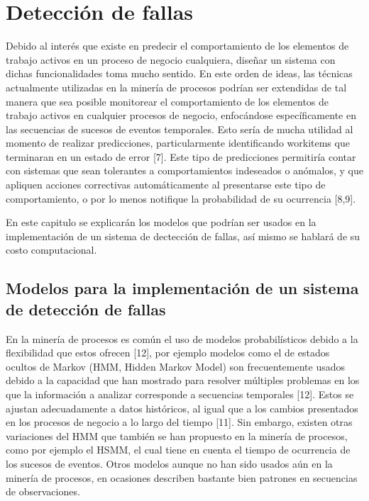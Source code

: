 \chapter{Detección de fallas}

\ifpdf
    \graphicspath{{Chapter3/Figs/Raster/}{Chapter3/Figs/PDF/}{Chapter3/Figs/}}
\else
    \graphicspath{{Chapter3/Figs/Vector/}{Chapter3/Figs/}}
\fi

Debido al interés que existe en predecir el comportamiento de los elementos de trabajo activos en un proceso de negocio cualquiera, diseñar un sistema con dichas funcionalidades toma mucho sentido. En este orden de ideas, las técnicas actualmente utilizadas en la minería de procesos podrían ser extendidas de tal manera que sea posible monitorear el comportamiento de los elementos de trabajo activos en cualquier procesos de negocio, enfocándose específicamente en las secuencias de sucesos de eventos temporales. Esto sería de mucha utilidad al momento de realizar predicciones, particularmente identificando workitems que terminaran en un estado de error [7]. Este tipo de predicciones permitiría contar con sistemas que sean tolerantes a comportamientos indeseados o anómalos, y que apliquen acciones correctivas automáticamente al presentarse este tipo de comportamiento, o por lo menos notifique la probabilidad de su ocurrencia [8,9]. 

En este capitulo se explicarán los modelos que podrían ser usados en la implementación de un sistema de dectección de fallas, así mismo se hablará de su costo computacional.

\section{Modelos para la implementación de un sistema de detección de fallas} %
\label{section3.1}

En la minería de procesos es común el uso de modelos probabilísticos debido a la flexibilidad que estos ofrecen [12], por ejemplo modelos como el de estados ocultos de Markov (HMM, Hidden Markov Model) son frecuentemente usados debido a la capacidad que han mostrado para resolver múltiples problemas en los que la información a analizar corresponde a secuencias temporales [12]. Estos se ajustan adecuadamente a datos históricos, al igual que a los cambios presentados en los procesos de negocio a lo largo del tiempo [11]. Sin embargo, existen otras variaciones del HMM que también se han propuesto en la minería de procesos, como por ejemplo el HSMM, el cual tiene en cuenta el tiempo de ocurrencia de los sucesos de eventos. Otros modelos aunque no han sido usados aún en la minería de procesos, en ocasiones describen bastante bien patrones en secuencias de observaciones. 

